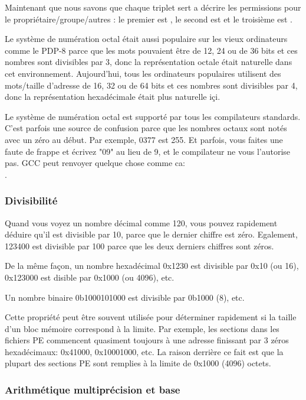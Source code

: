 Maintenant que nous savons que chaque triplet sert a décrire les permissions pour le propriétaire/groupe/autres : le premier est , le second est  et le troisième est .

Le système de numération octal était aussi populaire sur les vieux ordinateurs comme le PDP-8 parce que les mots pouvaient être de 12, 24 ou de 36 bits et ces nombres sont divisibles par 3, donc la représentation octale était naturelle dans cet environnement.
Aujourd'hui, tous les ordinateurs populaires utilisent des mots/taille d'adresse de 16, 32 ou de 64 bits et ces nombres sont divisibles par 4, donc la représentation hexadécimale était plus naturelle içi.

Le système de numération octal est supporté par tous les compilateurs \CCpp standards.
C'est parfois une source de confusion parce que les nombres octaux sont notés avec un zéro au début. Par exemple, 0377 est 255.
Et parfois, vous faites une faute de frappe et écrivez "09" au lieu de 9, et le compilateur ne vous l'autorise pas.
GCC peut renvoyer quelque chose comme ca:\\
. %

\subsubsection{Divisibilité}

Quand vous voyez un nombre décimal comme 120, vous pouvez rapidement déduire qu'il est divisible par 10, parce que le dernier chiffre est zéro.
Egalement, 123400 est divisible par 100 parce que les deux derniers chiffres sont zéros.

De la même façon, un nombre hexadécimal 0x1230 est divisible par 0x10 (ou 16), 0x123000 est disible par 0x1000 (ou 4096), etc.

Un nombre binaire 0b1000101000 est divisible par 0b1000 (8), etc.

Cette propriété peut être souvent utilisée pour déterminer rapidement si la taille d'un bloc mémoire correspond à la limite.
Par exemple, les sections dans les fichiers \ac{PE} commencent quasiment toujours à une adresse finissant par 3 zéros hexadécimaux: 0x41000, 0x10001000, etc.
La raison derrière ce fait est que la plupart des sections \ac{PE} sont remplies à la limite de 0x1000 (4096) octets.

\subsubsection{Arithmétique multiprécision et base}

